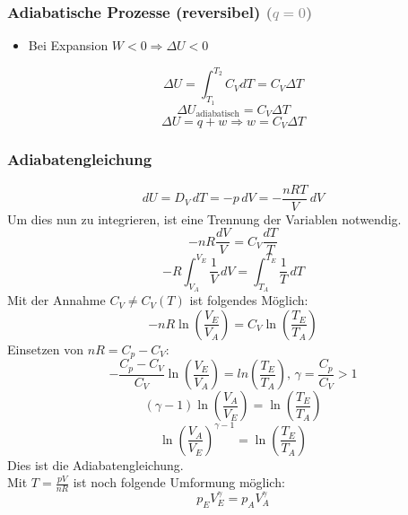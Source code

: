 \documentclass[a4paper]{article}
\begin{document}
\subsubsection{Adiabatische Prozesse (reversibel) \textcolor{gray}{($q=0$)}}
\begin{itemize}
    \item[] Bei Expansion $W < 0 \Rightarrow \Delta U < 0$
\end{itemize}
\begin{equation*}
    \Delta U = \int_{T_1}^{T_2} C_V dT = C_V \Delta T
\end{equation*}
\begin{equation*}
    \Delta U_{\mathrm{adiabatisch}} = C_V \Delta T
\end{equation*}
\begin{equation*}
    \Delta U = q + w \Rightarrow w = C_V \Delta T
\end{equation*}

\subsubsection{Adiabatengleichung}
\begin{equation*}
    dU = D_V \,dT = -p\,dV = - \frac{nRT}{V} \, dV
\end{equation*}
Um dies nun zu integrieren, ist eine Trennung der Variablen notwendig.
\begin{equation*}
    -nR \frac{dV}{V} = C_V \frac{dT}{T}
\end{equation*}
\begin{equation*}
    -R \int_{V_A}^{V_E} \frac{1}{V}\,dV = \int_{T_A}^{T_E} \frac{1}{T} \, dT
\end{equation*}
Mit der Annahme $C_V \neq C_V (T)$ ist folgendes Möglich:
\begin{equation*}
    -nR \ln\left(\frac{V_E}{V_A}\right) = C_V \ln\left(\frac{T_E}{T_A}\right)
\end{equation*}
Einsetzen von $nR = C_p - C_V$:
\begin{equation*}
    - \frac{C_p - C_V}{C_V} \ln\left(\frac{V_E}{V_A}\right) = ln\left(\frac{T_E}{T_A}\right), \, \gamma = \frac{C_p}{C_V} > 1
\end{equation*}
\begin{equation*}
    (\gamma - 1)\ln\left(\frac{V_A}{V_E}\right) = \ln\left(\frac{T_E}{T_A}\right)
\end{equation*}
\begin{equation*}
    \ln\left(\frac{V_A}{V_E}\right)^{\gamma-1} = \ln\left(\frac{T_E}{T_A}\right)
\end{equation*}
Dies ist die Adiabatengleichung.\\
Mit $T = \frac{pV}{nR}$ ist noch folgende Umformung möglich:
\begin{equation*}
    p_EV_E^\gamma = p_AV_A^\gamma
\end{equation*}
\end{document}
